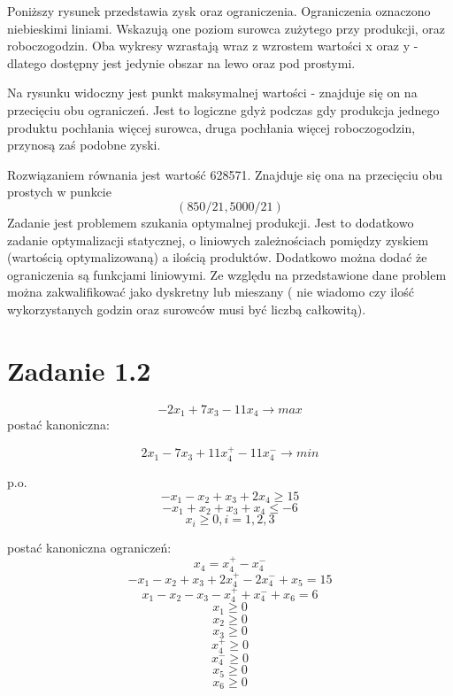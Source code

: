 \documentclass[paper=a4, fontsize=11pt]{scrartcl} %
\numberwithin{equation}{section} %
\numberwithin{figure}{section} %
\numberwithin{table}{section} %
\begin{document}
Poniższy rysunek przedstawia zysk oraz ograniczenia.
Ograniczenia oznaczono niebieskimi liniami. Wskazują one poziom surowca zużytego przy produkcji, oraz roboczogodzin.
Oba wykresy wzrastają wraz z wzrostem wartości x oraz y - dlatego dostępny jest jedynie obszar na lewo oraz pod prostymi.


Na rysunku widoczny jest punkt maksymalnej wartości - znajduje się on na przecięciu obu ograniczeń. Jest to logiczne gdyż podczas gdy
produkcja jednego produktu pochłania więcej surowca, druga pochłania więcej roboczogodzin, przynosą zaś podobne zyski.

Rozwiązaniem równania jest wartość 628571. Znajduje się ona na przecięciu obu prostych w punkcie \[(850/21,5000/21)\]
Zadanie jest problemem szukania optymalnej produkcji.
Jest to dodatkowo zadanie optymalizacji statycznej, o liniowych zależnościach pomiędzy zyskiem (wartością optymalizowaną) a ilością produktów.
Dodatkowo można dodać że ograniczenia są funkcjami liniowymi.
Ze względu na przedstawione dane problem można zakwalifikować jako dyskretny lub mieszany ( nie wiadomo czy ilość wykorzystanych godzin oraz surowców musi być liczbą całkowitą).


\newpage
\section{Zadanie 1.2}

\[-2x_1+7x_3-11x_4\rightarrow max\]
postać kanoniczna:

\[2x_1-7x_3+11x_4^+-11x_4^-\rightarrow  min\]

p.o.
\[-x_1-x_2+x_3+2x_4\geq15\]
\[-x_1+x_2+x_3+x_4\leq-6\]
\[x_i\geq0, i =1,2,3\]


postać kanoniczna ograniczeń:
\[x_4 = x_4^+  - x_4^-\]
\[-x_1-x_2+x_3+2x_4^+-2x_4^-+x_5=15\]
\[x_1-x_2-x_3-x_4^++x_4^-+x_6=6\]
\[x_1\geq0\]
\[x_2\geq0\]
\[x_3\geq0\]
\[x_4^+\geq0\]
\[x_4^-\geq0\]
\[x_5\geq0\]
\[x_6\geq0\]
\end{document}
